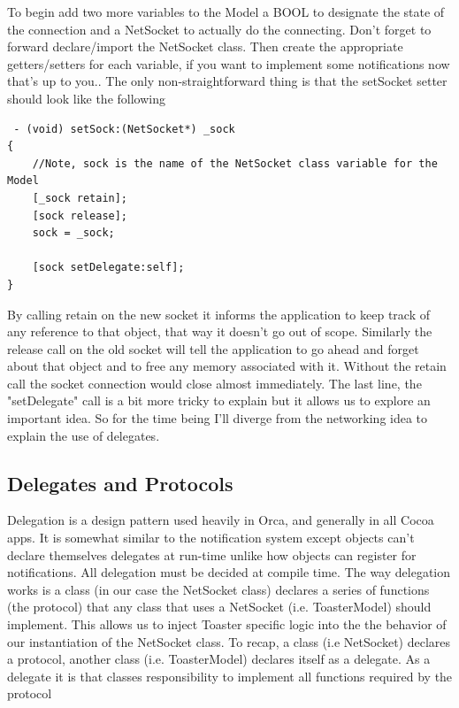 \documentclass[12pt,a4paper]{article}
\begin{document}
 To begin add two more variables to the Model a BOOL to designate the state of the connection and a NetSocket to actually do the connecting.
 Don't forget to forward declare/import the NetSocket class.
 Then create the appropriate getters/setters for each variable, if you want to implement some notifications now that's up to you..
 The only non-straightforward thing is that the setSocket setter should look like the following
\begin{lstlisting}
 - (void) setSock:(NetSocket*) _sock
{
    //Note, sock is the name of the NetSocket class variable for the Model
    [_sock retain];
    [sock release];
    sock = _sock;
    
    [sock setDelegate:self];  
}
\end{lstlisting}
By calling retain on the new socket it informs the application to keep track of any reference to that object, that way it doesn't go out of scope.
Similarly the release call on the old socket will tell the application to go ahead and forget about that object and to free any memory associated with it.
Without the retain call the socket connection would close almost immediately.  
The last line, the "setDelegate" call is a bit more tricky to explain but it allows us to explore an important idea.
So for the time being I'll diverge from the networking idea to explain the use of delegates.
\subsection{Delegates and Protocols}
Delegation is a design pattern used heavily in Orca, and generally in all Cocoa apps. 
It is somewhat similar to the notification system except objects can't declare themselves delegates at run-time unlike how objects can register for notifications.
 All delegation must be decided at compile time.
 The way delegation works is a class (in our case the NetSocket class) declares a series of functions (the protocol) that any class that uses a NetSocket (i.e. ToasterModel) should implement.
  This allows us to inject Toaster specific logic into the the behavior of our instantiation of the NetSocket class. 
  To recap, a class (i.e NetSocket) declares a protocol, another class (i.e. ToasterModel) declares itself as a delegate. 
  As a delegate it is that classes responsibility to implement all functions required by the protocol
  
\end{document}
